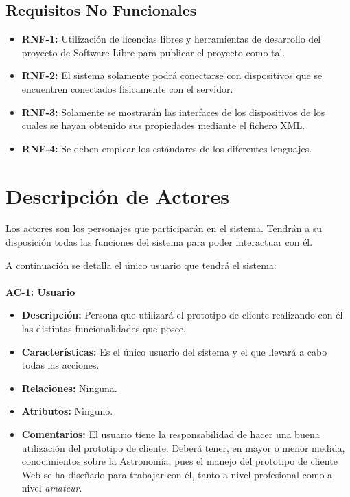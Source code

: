 \subsection{Requisitos No Funcionales}
\begin{itemize}
  \item \textbf{RNF-1:} Utilización de licencias libres y herramientas de desarrollo del proyecto de Software Libre para publicar el proyecto como tal.
  \item \textbf{RNF-2:} El sistema solamente podrá conectarse con dispositivos que se encuentren conectados físicamente con el servidor.
  \item \textbf{RNF-3:} Solamente se mostrarán las interfaces de los dispositivos de los cuales se hayan obtenido sus propiedades mediante el fichero XML.
  \item \textbf{RNF-4:} Se deben emplear los estándares de los diferentes lenguajes.
\end{itemize}

\section{Descripción de Actores}
Los actores son los personajes que participarán en el sistema. Tendrán a su disposición todas las funciones del sistema para poder interactuar con él.

A continuación se detalla el único usuario que tendrá el sistema:\\ \\
\textbf{AC-1: Usuario}
\begin{itemize}
  \item \textbf{Descripción:} Persona que utilizará el prototipo de cliente realizando con él las distintas funcionalidades que posee.
  \item \textbf{Características:} Es el único usuario del sistema y el que llevará a cabo todas las acciones.
  \item \textbf{Relaciones:} Ninguna.
  \item \textbf{Atributos:} Ninguno.
  \item \textbf{Comentarios:} El usuario tiene la responsabilidad de hacer una buena utilización del prototipo de cliente. Deberá tener, en mayor o menor medida, conocimientos sobre la Astronomía, pues el manejo del prototipo de cliente Web se ha diseñado para trabajar con él, tanto a nivel profesional como a nivel \textit{amateur}.
\end{itemize}

